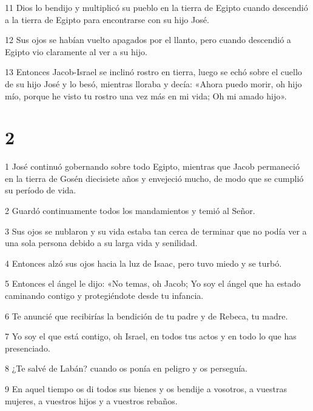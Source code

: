 \par 11 Dios lo bendijo y multiplicó su pueblo en la tierra de Egipto cuando descendió a la tierra de Egipto para encontrarse con su hijo José.

\par 12 Sus ojos se habían vuelto apagados por el llanto, pero cuando descendió a Egipto vio claramente al ver a su hijo.

\par 13 Entonces Jacob-Israel se inclinó rostro en tierra, luego se echó sobre el cuello de su hijo José y lo besó, mientras lloraba y decía: «Ahora puedo morir, oh hijo mío, porque he visto tu rostro una vez más en mi vida; Oh mi amado hijo».


\chapter{2}


\par 1 José continuó gobernando sobre todo Egipto, mientras que Jacob permaneció en la tierra de Gosén diecisiete años y envejeció mucho, de modo que se cumplió su período de vida.

\par 2 Guardó continuamente todos los mandamientos y temió al Señor.

\par 3 Sus ojos se nublaron y su vida estaba tan cerca de terminar que no podía ver a una sola persona debido a su larga vida y senilidad.

\par 4 Entonces alzó sus ojos hacia la luz de Isaac, pero tuvo miedo y se turbó.

\par 5 Entonces el ángel le dijo: «No temas, oh Jacob; Yo soy el ángel que ha estado caminando contigo y protegiéndote desde tu infancia.

\par 6 Te anuncié que recibirías la bendición de tu padre y de Rebeca, tu madre.

\par 7 Yo soy el que está contigo, oh Israel, en todos tus actos y en todo lo que has presenciado.

\par 8 ¿Te salvé de Labán? cuando os ponía en peligro y os perseguía.

\par 9 En aquel tiempo os di todos sus bienes y os bendije a vosotros, a vuestras mujeres, a vuestros hijos y a vuestros rebaños.

